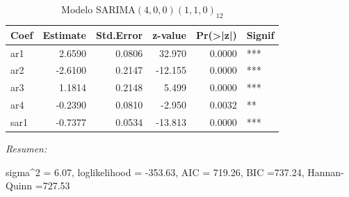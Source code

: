 \documentclass[12pt,oneside]{book}\usepackage[]{graphicx}\usepackage[]{color}
\newenvironment{knitrout}{}{} %
\theoremstyle{definition} %
\begin{document}
\begin{knitrout}
\color{fgcolor}\begin{table}

\caption{\label{tab:unnamed-chunk-17}\label{mod:sarima_resid13}Modelo SARIMA$(4,0,0)(1,1,0)_{12}$}
\centering
\begin{threeparttable}
\begin{tabular}[t]{lrrrrl}
\toprule
Coef & Estimate & Std.Error & z-value & Pr(>|z|) & Signif\\
\midrule
\rowcolor{gray!6}  ar1 & 2.6590 & 0.0806 & 32.970 & 0.0000 & ***\\
ar2 & -2.6100 & 0.2147 & -12.155 & 0.0000 & ***\\
\rowcolor{gray!6}  ar3 & 1.1814 & 0.2148 & 5.499 & 0.0000 & ***\\
ar4 & -0.2390 & 0.0810 & -2.950 & 0.0032 & **\\
\rowcolor{gray!6}  sar1 & -0.7377 & 0.0534 & -13.813 & 0.0000 & ***\\
\bottomrule
\end{tabular}
\begin{tablenotes}
\item \textit{Resumen:} 
\item sigma\textasciicircum{}2 = 6.07, loglikelihood = -353.63, AIC = 719.26, BIC =737.24, Hannan-Quinn =727.53
\end{tablenotes}
\end{threeparttable}
\end{table}


\end{knitrout}
\end{document}
